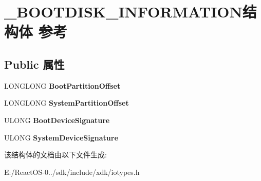 \hypertarget{struct___b_o_o_t_d_i_s_k___i_n_f_o_r_m_a_t_i_o_n}{}\section{\+\_\+\+B\+O\+O\+T\+D\+I\+S\+K\+\_\+\+I\+N\+F\+O\+R\+M\+A\+T\+I\+O\+N结构体 参考}
\label{struct___b_o_o_t_d_i_s_k___i_n_f_o_r_m_a_t_i_o_n}
\subsection*{Public 属性}
\begin{DoxyCompactItemize}
\item 
\mbox{\label{struct___b_o_o_t_d_i_s_k___i_n_f_o_r_m_a_t_i_o_n_a203e1d2fbeb61b9d71031f0538f903a1}} 
L\+O\+N\+G\+L\+O\+NG {\bfseries Boot\+Partition\+Offset}
\item 
\mbox{\label{struct___b_o_o_t_d_i_s_k___i_n_f_o_r_m_a_t_i_o_n_a05e1caccd6d3fa622eb93b6a49f16617}} 
L\+O\+N\+G\+L\+O\+NG {\bfseries System\+Partition\+Offset}
\item 
\mbox{\label{struct___b_o_o_t_d_i_s_k___i_n_f_o_r_m_a_t_i_o_n_a5c2cc79cf79dd98a4fe5ea4f2e78614d}} 
U\+L\+O\+NG {\bfseries Boot\+Device\+Signature}
\item 
\mbox{\label{struct___b_o_o_t_d_i_s_k___i_n_f_o_r_m_a_t_i_o_n_a8e9152bc482fe050655a6f9f6d1612cc}} 
U\+L\+O\+NG {\bfseries System\+Device\+Signature}
\end{DoxyCompactItemize}


该结构体的文档由以下文件生成\+:\begin{DoxyCompactItemize}
\item 
E\+:/\+React\+O\+S-\/0../sdk/include/xdk/iotypes.\+h\end{DoxyCompactItemize}
